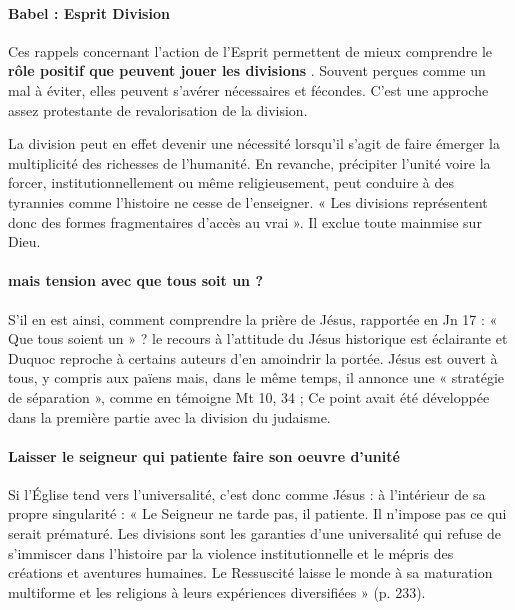 \paragraph{Babel : Esprit Division}
Ces rappels concernant l’action de l’Esprit permettent de mieux comprendre le \textbf{rôle positif que peuvent jouer les divisions} . Souvent perçues comme un mal à éviter, elles peuvent s’avérer nécessaires et fécondes. C'est une approche assez protestante de revalorisation de la division. 

  La division peut en effet devenir une nécessité lorsqu’il s’agit de faire émerger la multiplicité des richesses de l’humanité. En revanche, précipiter l’unité voire la forcer, institutionnellement ou même religieusement, peut conduire à des tyrannies comme l’histoire ne cesse de l’enseigner.  « Les divisions représentent donc des formes fragmentaires d’accès au vrai ». Il exclue toute mainmise sur Dieu.  

\paragraph{mais tension avec que tous soit un ?}
S’il en est ainsi, comment comprendre la prière de Jésus, rapportée en Jn 17 : « Que tous soient un » ?  le recours à l’attitude du Jésus historique est éclairante et Duquoc reproche à certains auteurs d’en amoindrir la portée. Jésus est ouvert à tous, y compris aux païens mais, dans le même temps, il annonce une « stratégie de séparation », comme en témoigne Mt 10, 34 ; Ce point avait été développée dans la première partie avec la division du judaisme.

\paragraph{Laisser le seigneur qui patiente faire son oeuvre d'unité}
Si l’Église tend vers l’universalité, c’est donc comme Jésus : à l’intérieur de sa propre singularité : « Le Seigneur ne tarde pas, il patiente. Il n’impose pas ce qui serait prématuré. Les divisions sont les garanties d’une universalité qui refuse de s’immiscer dans l’histoire par la violence institutionnelle et le mépris des créations et aventures humaines. Le Ressuscité laisse le monde à sa maturation multiforme et les religions à leurs expériences diversifiées » (p. 233).

